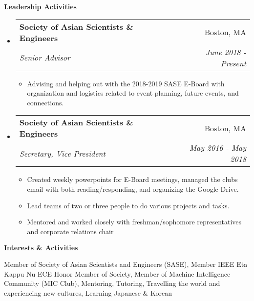 \documentclass[letterpaper, 8pt]{extarticle}
\makeatletter
\newcommand{\resitem}[1]{\item #1 \vspace{-2pt}}
\newcommand{\resheading}[1]{{\large \colorbox{mygrey}{\begin{minipage}{0.99\textwidth}{\textbf{#1 \vphantom{p\^{E}}}}\end{minipage}}}}
\newcommand{\ressubheading}[4]{
\begin{tabular*}{7.0in}{l@{\extracolsep{\fill}}r}
		\textbf{#1} & #2 \\
		\textit{#3} & \textit{#4} \\
\end{tabular*}\vspace{-6pt}}
\makeatother
\begin{document}
\resheading{Leadership Activities}
\begin{itemize}
    \item 	\ressubheading{Society of Asian Scientists \& Engineers}{Boston, MA}{Senior Advisor}{June 2018 - Present}
    \begin{itemize} 
        \item Advising and helping out with the 2018-2019 SASE E-Board with organization and logistics related to event planning, future events, and connections.
    \end{itemize}
    \item 	\ressubheading{Society of Asian Scientists \& Engineers}{Boston, MA}{Secretary, Vice President}{May 2016 - May 2018}
    \begin{itemize} 
        \resitem{Created weekly powerpoints for E-Board meetings, managed the clubs email with both reading/responding, and organizing the Google Drive.}
        \resitem{Lead teams of two or three people to do various projects and tasks.}
        \resitem{Mentored and worked closely with freshman/sophomore representatives and corporate relations chair}
    \end{itemize}
\end{itemize}

\resheading{Interests \& Activities}
Member of Society of Asian Scientists and Engineers (SASE), Member IEEE Eta Kappu Nu ECE Honor Member of Society, Member of Machine Intelligence Community (MIC Club), Mentoring, Tutoring, Travelling the world and experiencing new cultures, Learning Japanese \& Korean



\begin{comment}
\pagebreak

\resheading{Publications}

\begin{description}
\item["Security-Enhanced Darwin: Porting SELinux to Mac OS X",]
\emph{Proceedings from the Third Annual Security Enhanced Linux Symposium} in Baltimore, MD, 2007.
\item["{\sc \bf UNIX} System Administration Handbook, Third Edition",]
contributing author.
\item["strlcpy and strlcat:  Consistent, Safe, String Copy and Concatenation",]
\emph{Proceedings from the USENIX Annual Technical Conference} in Monterey, CA, 1999.
\item["satool:  A System Administrators Cockpit",]
\emph{Proceedings from the USENIX LISA VII Conference (Large Installation Systems Administration)} in Monterey, CA, 1993.
\end{description}

\resheading{Patents}

\begin{description}
\item[Furlong, Wesley J., Schlossnagle, George, Miller, Todd.  2014.]
Method and system for adaptive delivery of digital messages.
U.S. Patent 8,782,184 filed September 20, 2013, and issued July 15, 2014.
\end{description}
\end{comment}
\end{document}
